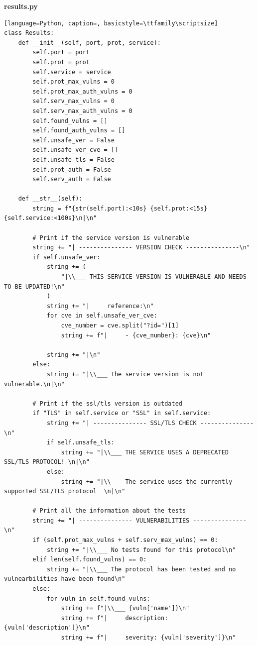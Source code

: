 \documentclass[12pt]{report}
\begin{document}
\noindent
\textbf{results.py}
\begin{lstlisting}[language=Python, caption=, basicstyle=\ttfamily\scriptsize]
class Results:
    def __init__(self, port, prot, service):
        self.port = port
        self.prot = prot
        self.service = service
        self.prot_max_vulns = 0
        self.prot_max_auth_vulns = 0
        self.serv_max_vulns = 0
        self.serv_max_auth_vulns = 0
        self.found_vulns = []
        self.found_auth_vulns = []
        self.unsafe_ver = False
        self.unsafe_ver_cve = []
        self.unsafe_tls = False
        self.prot_auth = False
        self.serv_auth = False

    def __str__(self):
        string = f"{str(self.port):<10s} {self.prot:<15s} {self.service:<100s}\n|\n"

        # Print if the service version is vulnerable
        string += "| --------------- VERSION CHECK ---------------\n"
        if self.unsafe_ver:
            string += (
                "|\\___ THIS SERVICE VERSION IS VULNERABLE AND NEEDS TO BE UPDATED!\n"
            )
            string += "|     reference:\n"
            for cve in self.unsafe_ver_cve:
                cve_number = cve.split("?id=")[1]
                string += f"|     - {cve_number}: {cve}\n"

            string += "|\n"
        else:
            string += "|\\___ The service version is not vulnerable.\n|\n"

        # Print if the ssl/tls version is outdated
        if "TLS" in self.service or "SSL" in self.service:
            string += "| --------------- SSL/TLS CHECK ---------------\n"
            if self.unsafe_tls:
                string += "|\\___ THE SERVICE USES A DEPRECATED SSL/TLS PROTOCOL! \n|\n"
            else:
                string += "|\\___ The service uses the currently supported SSL/TLS protocol  \n|\n"

        # Print all the information about the tests
        string += "| --------------- VULNERABILITIES ---------------\n"
        if (self.prot_max_vulns + self.serv_max_vulns) == 0:
            string += "|\\___ No tests found for this protocol\n"
        elif len(self.found_vulns) == 0:
            string += "|\\___ The protocol has been tested and no vulnearbilities have been found\n"
        else:
            for vuln in self.found_vulns:
                string += f"|\\___ {vuln['name']}\n"
                string += f"|     description: {vuln['description']}\n"
                string += f"|     severity: {vuln['severity']}\n"


\end{lstlisting}
\end{document}

